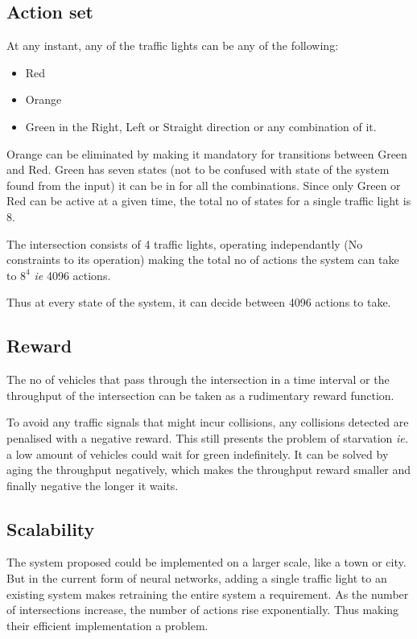 \documentclass[a4paper,12pt]{report}
\begin{document}
			\subsection{Action set}
				At any instant, any of the traffic lights can be any of the following:
				\begin{itemize}
					\setlength\itemsep{0em}
					\item Red
					\item Orange
					\item Green in the Right, Left or Straight direction or any combination of it.
				\end{itemize}

				Orange can be eliminated by making it mandatory for transitions between Green and Red. Green has seven states (not to be confused with state of the system found from the input) it can be in for all the combinations. Since only Green or Red can be active at a given time, the total no of states for a single traffic light is 8.

				The intersection consists of 4 traffic lights, operating independantly (No constraints to its operation) making the total no of actions the system can take to $8^4$ \emph{ie} 4096 actions.

				Thus at every state of the system, it can decide between 4096 actions to take.
			\subsection{Reward}
				The no of vehicles that pass through the intersection in a time interval or the throughput of the intersection can be taken as a rudimentary reward function.

				To avoid any traffic signals that might incur collisions, any collisions detected are penalised with a negative reward. This still presents the problem of starvation \emph{ie.} a low amount of vehicles could wait for green indefinitely. It can be solved by aging the throughput negatively, which makes the throughput reward smaller and finally negative the longer it waits.
			\subsection{Scalability}
				The system proposed could be implemented on a larger scale, like a town or city. But in the current form of neural networks, adding a single traffic light to an existing system makes retraining the entire system a requirement. As the number of intersections increase, the number of actions rise exponentially. Thus making their efficient implementation a problem.
\end{document}
